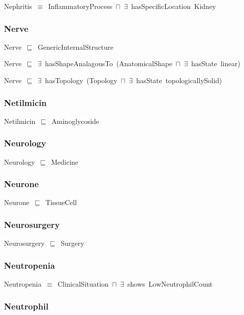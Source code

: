\documentclass{article}
\begin{document}
Nephritis~\ensuremath{\equiv}~InflammatoryProcess~\ensuremath{\sqcap}~\ensuremath{\exists}~hasSpecificLocation~Kidney

\subsubsection*{Nerve}

Nerve~\ensuremath{\sqsubseteq}~GenericInternalStructure~

Nerve~\ensuremath{\sqsubseteq}~\ensuremath{\exists}~hasShapeAnalagousTo~(AnatomicalShape~\ensuremath{\sqcap}~\ensuremath{\exists}~hasState~linear)~

Nerve~\ensuremath{\sqsubseteq}~\ensuremath{\exists}~hasTopology~(Topology~\ensuremath{\sqcap}~\ensuremath{\exists}~hasState~topologicallySolid)~

\subsubsection*{Netilmicin}

Netilmicin~\ensuremath{\sqsubseteq}~Aminoglycoside~

\subsubsection*{Neurology}

Neurology~\ensuremath{\sqsubseteq}~Medicine~

\subsubsection*{Neurone}

Neurone~\ensuremath{\sqsubseteq}~TissueCell~

\subsubsection*{Neurosurgery}

Neurosurgery~\ensuremath{\sqsubseteq}~Surgery~

\subsubsection*{Neutropenia}

Neutropenia~\ensuremath{\equiv}~ClinicalSituation~\ensuremath{\sqcap}~\ensuremath{\exists}~shows~LowNeutrophilCount

\subsubsection*{Neutrophil}
\end{document}

